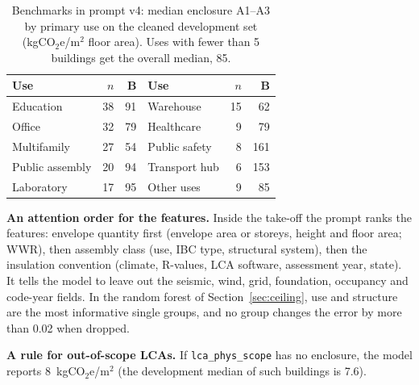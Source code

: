 \documentclass[10pt,letterpaper]{article}
\newcommand{\coe}{kgCO$_2$e/m$^2$}
\begin{document}
\begin{table}[t]
\centering\footnotesize
\caption{Benchmarks in prompt v4: median enclosure A1--A3 by primary use on the cleaned development set (\coe{} floor area). Uses with fewer than 5 buildings get the overall median, 85.}
\label{tab:bench}
\setlength{\tabcolsep}{4pt}
\begin{tabular}{lrr@{\hskip 10pt}lrr}
\toprule
Use & $n$ & B & Use & $n$ & B \\
\midrule
Education & 38 & 91 & Warehouse & 15 & 62 \\
Office & 32 & 79 & Healthcare & 9 & 79 \\
Multifamily & 27 & 54 & Public safety & 8 & 161 \\
Public assembly & 20 & 94 & Transport hub & 6 & 153 \\
Laboratory & 17 & 95 & Other uses & 9 & 85 \\
\bottomrule
\end{tabular}
\end{table}

\textbf{An attention order for the features.} Inside the take-off the prompt ranks the features: envelope quantity first (envelope area or storeys, height and floor area; WWR), then assembly class (use, IBC type, structural system), then the insulation convention (climate, R-values, LCA software, assessment year, state). It tells the model to leave out the seismic, wind, grid, foundation, occupancy and code-year fields. In the random forest of Section~\ref{sec:ceiling}, use and structure are the most informative single groups, and no group changes the error by more than 0.02 when dropped.

\textbf{A rule for out-of-scope LCAs.} If \texttt{lca\_phys\_scope} has no enclosure, the model reports 8~\coe{} (the development median of such buildings is 7.6).
\end{document}
